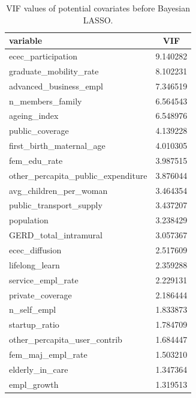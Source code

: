 \begin{table}[h]
\centering
\caption{VIF values of potential covariates before Bayesian LASSO.}
\label{tab:vif_values}
\begin{tabular}{lc}
\hline
\textbf{variable} & \textbf{VIF} \\
\hline
ecec\_participation & 9.140282 \\
graduate\_mobility\_rate & 8.102231 \\
advanced\_business\_empl & 7.346519 \\
n\_members\_family & 6.564543 \\
ageing\_index & 6.548976 \\
public\_coverage & 4.139228 \\
first\_birth\_maternal\_age & 4.010305 \\
fem\_edu\_rate & 3.987515 \\
other\_percapita\_public\_expenditure & 3.876044 \\
avg\_children\_per\_woman & 3.464354 \\
public\_transport\_supply & 3.437207 \\
population & 3.238429 \\
GERD\_total\_intramural & 3.057367 \\
ecec\_diffusion & 2.517609 \\
lifelong\_learn & 2.359288 \\
service\_empl\_rate & 2.229131 \\
private\_coverage & 2.186444 \\
n\_self\_empl & 1.833873 \\
startup\_ratio & 1.784709 \\
other\_percapita\_user\_contrib & 1.684447 \\
fem\_maj\_empl\_rate & 1.503210 \\
elderly\_in\_care & 1.347364 \\
empl\_growth & 1.319513 \\
\hline
\end{tabular}
\end{table}
